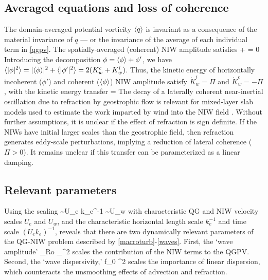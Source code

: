 \documentclass{jfm}
\begin{document}
\subsection{Averaged equations and loss of coherence}
The domain-averaged potential vorticity $\langle q \rangle$ is invariant as a consequence of
the material invariance of $q$ --- or the invariance of the average of each
individual term in \eqref{qgpv}. The spatially-averaged (coherent) NIW amplitude
satisfies
\beq
\label{phi_ave}
\la \phi \ra + \ii \left\la\half\phi\lap\psi \right\ra = 0\per
\eeq
Introducing the decomposition $\phi = \langle\phi\rangle+\phi'$, we have $\langle|\phi|^2\rangle
= |\langle\phi\rangle|^2 +
\langle|\phi'|^2\rangle = 2(K_w^c + K_w^i)$.
Thus, the kinetic energy of horizontally incoherent ($\phi'$) and coherent
($\langle\phi\rangle$) NIW amplitude satisfy $\dot{K}_w^i = \Pi$ and $\dot{K}_w^c = -\Pi$,
with the kinetic energy transfer
\beq
\label{Pi}
\Pi = \left[\la\half\phi\lap\psi\ra\la\phis\ra -
\la\half\phis\lap\psi\ra\la\phi\ra\right]\per
\eeq
The decay of a laterally coherent near-inertial oscillation due to refraction by
geostrophic flow is relevant for mixed-layer slab models used to estimate the work
imparted by wind into the NIW field \citep[e.g., ][]{alford2001}. Without further
assumptions, it is unclear if the effect of refraction is sign definite. If the
NIWs have initial larger scales than the geostrophic field, then refraction
generates eddy-scale perturbations, implying a reduction of lateral coherence
($\Pi > 0$). It remains unclear if this transfer can be parameterized as a linear
damping.

\subsection{Relevant parameters}
Using the scaling
\beq
\psi \sim U_e k_e^{-1} \com\qquad {} \qquad \phi \sim U_w\com
\eeq
with characteristic QG and NIW velocity scales $U_e$ and $U_w$, and the
characteristic horizontal length scale $k_e^{-1}$ and time scale $(U_e k_e)^{-1}$,
reveals that there are two dynamically relevant parameters of the QG-NIW problem
described by \eqref{macroturb}-\eqref{waves}. First, the `wave amplitude'
\beq
\label{alpha}
\alpha {} {}_{ Ro} \times
{}_{ \ep^2}\com
\eeq
scales the contribution of the NIW terms to the QGPV.
Second, the `wave dispersivity,'
\beq
\label{hslash}
\hslash {} f_0 \lambda^2 \times {}\com
\eeq
scales the importance of linear dispersion, which counteracts the unsmoothing
effects of advection and refraction.
\end{document}
